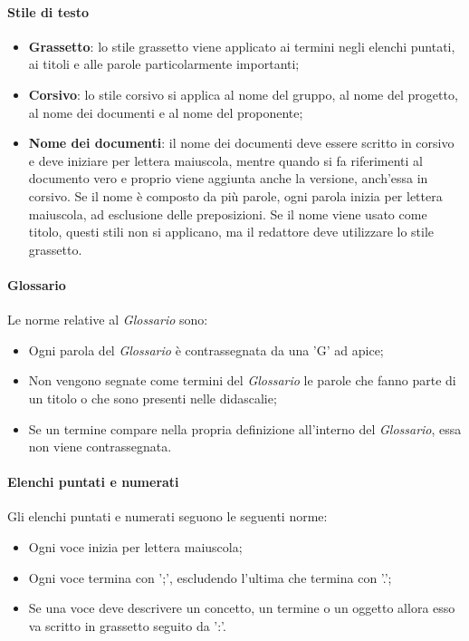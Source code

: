 \paragraph{Stile di testo}
\begin{itemize}

	\item \textbf{Grassetto}: lo stile grassetto viene applicato ai termini negli elenchi puntati, ai titoli e alle parole particolarmente importanti;
	
	\item \textbf{Corsivo}: lo stile corsivo si applica al nome del gruppo, al nome del progetto, al nome dei documenti e al nome del proponente;
	
	\item \textbf{Nome dei documenti}: il nome dei documenti deve essere scritto in corsivo e deve iniziare per lettera maiuscola, mentre quando si fa riferimenti al documento vero e proprio viene aggiunta anche la versione, anch'essa in corsivo. Se il nome è composto da più parole, ogni parola inizia per lettera maiuscola, ad esclusione delle preposizioni.  Se il nome viene usato come titolo, questi stili non si applicano, ma il redattore deve utilizzare lo stile grassetto.

\end{itemize}

\paragraph{Glossario}
Le norme relative al \textit{Glossario} sono:
\begin{itemize}

	\item Ogni parola del \textit{Glossario} è contrassegnata da una 'G' ad apice;
	
	\item Non vengono segnate come termini del \textit{Glossario} le parole che fanno parte di un titolo o che sono presenti nelle didascalie;
	
	\item Se un termine compare nella propria definizione all'interno del \textit{Glossario}, essa non viene contrassegnata.

\end{itemize}

\paragraph{Elenchi puntati e numerati}
Gli elenchi puntati e numerati seguono le seguenti norme:
\begin{itemize}

	\item Ogni voce inizia per lettera maiuscola;
	
	\item Ogni voce termina con ';', escludendo l'ultima che termina con '.';
	
	\item Se una voce deve descrivere un concetto, un termine o un oggetto allora esso va scritto in grassetto seguito da ':'.
\end{itemize}


